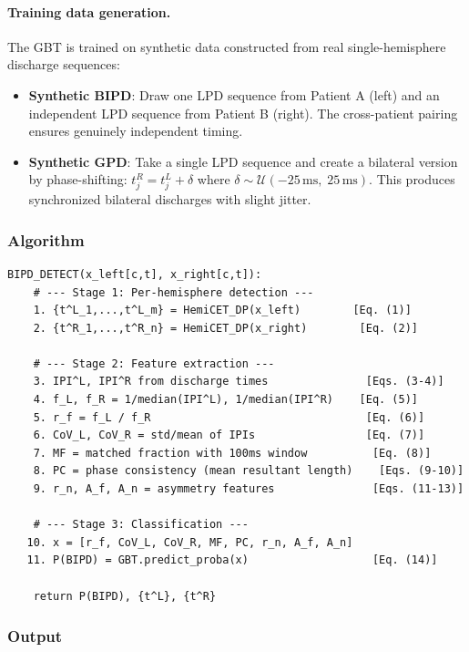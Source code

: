\paragraph{Training data generation.}
The GBT is trained on synthetic data constructed from real single-hemisphere discharge sequences:
\begin{itemize}
  \item \textbf{Synthetic BIPD}: Draw one LPD sequence from Patient A (left) and an independent LPD sequence from Patient B (right). The cross-patient pairing ensures genuinely independent timing.
  \item \textbf{Synthetic GPD}: Take a single LPD sequence and create a bilateral version by phase-shifting: $t_j^R = t_j^L + \delta$ where $\delta \sim \mathcal{U}(-25\,\mathrm{ms},\; 25\,\mathrm{ms})$. This produces synchronized bilateral discharges with slight jitter.
\end{itemize}

\subsubsection{Algorithm}

\begin{verbatim}
BIPD_DETECT(x_left[c,t], x_right[c,t]):
    # --- Stage 1: Per-hemisphere detection ---
    1. {t^L_1,...,t^L_m} = HemiCET_DP(x_left)        [Eq. (1)]
    2. {t^R_1,...,t^R_n} = HemiCET_DP(x_right)        [Eq. (2)]

    # --- Stage 2: Feature extraction ---
    3. IPI^L, IPI^R from discharge times               [Eqs. (3-4)]
    4. f_L, f_R = 1/median(IPI^L), 1/median(IPI^R)    [Eq. (5)]
    5. r_f = f_L / f_R                                 [Eq. (6)]
    6. CoV_L, CoV_R = std/mean of IPIs                 [Eq. (7)]
    7. MF = matched fraction with 100ms window          [Eq. (8)]
    8. PC = phase consistency (mean resultant length)    [Eqs. (9-10)]
    9. r_n, A_f, A_n = asymmetry features               [Eqs. (11-13)]

    # --- Stage 3: Classification ---
   10. x = [r_f, CoV_L, CoV_R, MF, PC, r_n, A_f, A_n]
   11. P(BIPD) = GBT.predict_proba(x)                   [Eq. (14)]

    return P(BIPD), {t^L}, {t^R}
\end{verbatim}

\subsubsection{Output}

